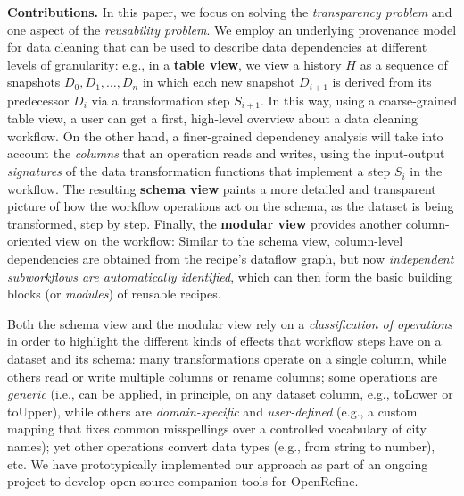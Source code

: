 \documentclass[conference]{ijdc-v14}
\newcommand{\openrefine}{\textrm{OpenRefine}\xspace}
\newcommand{\co}[1]{\textsf{\small{#1}}}
\begin{document}
\textbf{Contributions.} In this paper, we focus on solving the \emph{transparency problem} and one
aspect of the \emph{reusability problem}. We employ an underlying provenance model for data cleaning
that can be used to describe data dependencies at different levels of granularity: e.g., in a
{\textbf{table view}}, we view a history $H$ as a sequence of snapshots $D_0, D_1, \dots, D_n$ in
which each new snapshot $D_{i+1}$ is derived from its predecessor $D_{i}$ via a transformation step
$S_{i+1}$.  In this way, using a coarse-grained table view, a user can get a first, high-level
overview about a data cleaning workflow. On the other hand, a finer-grained dependency analysis will
take into account the \emph{columns} that an operation reads and writes, using the input-output
\emph{signatures} of the data transformation functions that implement a step $S_i$ in the workflow.
The resulting {\textbf{schema view}} paints a more detailed and transparent picture of how the
workflow operations act on the schema, as the dataset is being transformed, step by step.  Finally,
the {\textbf{modular view}} provides another column-oriented view on the workflow: Similar to the
schema view, column-level dependencies are obtained from the recipe's dataflow graph, but now
\emph{independent subworkflows are automatically identified}, which can then form the basic building
blocks (or \emph{modules}) of reusable recipes.
%

Both the schema view and the modular view rely on a \emph{classification of operations} in order to
highlight the different kinds of effects that workflow steps have on a dataset and its
schema: %
many transformations operate on a {single} column, while others read or write {multiple} columns or
rename columns; some operations are \emph{generic} (i.e., can be applied, in principle, on any
dataset column, e.g., \co{toLower} or \co{toUpper}), while others are \emph{domain-specific}
and \emph{user-defined} (e.g., a custom mapping that fixes common misspellings over a controlled
vocabulary of city names); yet other operations convert data types (e.g., from string to number),
etc. We have prototypically implemented our approach as part of an ongoing project to develop
open-source companion tools for \openrefine \cite{orma2021}.


\end{document}
